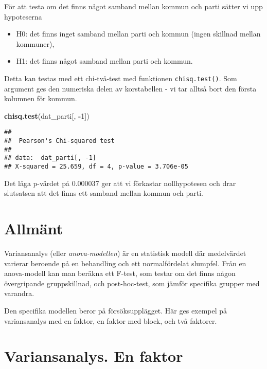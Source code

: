 \documentclass[
]{book}
\newenvironment{Shaded}{\begin{snugshade}}{\end{snugshade}}
\newcommand{\DecValTok}[1]{\textcolor[rgb]{0.00,0.00,0.81}{#1}}
\newcommand{\FunctionTok}[1]{\textcolor[rgb]{0.13,0.29,0.53}{\textbf{#1}}}
\newcommand{\NormalTok}[1]{#1}
\newcommand{\SpecialCharTok}[1]{\textcolor[rgb]{0.81,0.36,0.00}{\textbf{#1}}}
\providecommand{\tightlist}{%
  \setlength{\itemsep}{0pt}\setlength{\parskip}{0pt}}
\theoremstyle{definition}
\theoremstyle{definition}
\theoremstyle{definition}
\theoremstyle{definition}
\theoremstyle{remark}
\begin{document}
För att testa om det finns något samband mellan kommun och parti sätter vi upp hypoteserna

\begin{itemize}
\tightlist
\item
  H0: det finns inget samband mellan parti och kommun (ingen skillnad mellan kommuner),
\item
  H1: det finns något samband mellan parti och kommun.
\end{itemize}

Detta kan testas med ett chi-två-test med funktionen \texttt{chisq.test()}. Som argument ges den numeriska delen av korstabellen - vi tar alltså bort den första kolumnen för kommun.

\begin{Shaded}
\begin{Highlighting}[]
\FunctionTok{chisq.test}\NormalTok{(dat\_parti[, }\SpecialCharTok{{-}}\DecValTok{1}\NormalTok{])}
\end{Highlighting}
\end{Shaded}

\begin{verbatim}
## 
##  Pearson's Chi-squared test
## 
## data:  dat_parti[, -1]
## X-squared = 25.659, df = 4, p-value = 3.706e-05
\end{verbatim}

Det låga p-värdet på 0.000037 ger att vi förkastar nollhypotesen och drar slutsatsen att det finns ett samband mellan kommun och parti.

\hypertarget{allmuxe4nt}{%
\section{Allmänt}\label{allmuxe4nt}}

Variansanalys (eller \emph{anova-modellen}) är en statistisk modell där medelvärdet varierar beroende på en behandling och ett normalfördelat slumpfel. Från en anova-modell kan man beräkna ett F-test, som testar om det finns någon övergripande gruppskillnad, och post-hoc-test, som jämför specifika grupper med varandra.

Den specifika modellen beror på försöksupplägget. Här ges exempel på variansanalys med en faktor, en faktor med block, och två faktorer.

\hypertarget{variansanalys.-en-faktor}{%
\section{Variansanalys. En faktor}\label{variansanalys.-en-faktor}}
\end{document}
